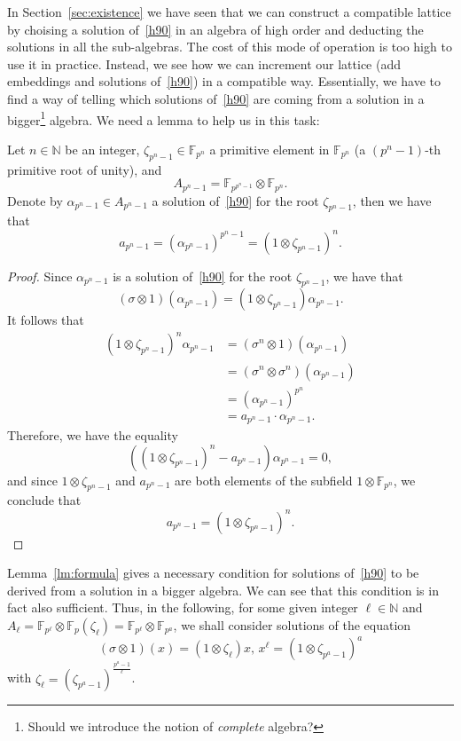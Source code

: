 \documentclass[a4paper,11pt]{article}
\begin{document}
In Section~\ref{sec:existence} we have seen that we can construct a compatible
lattice by choising a solution of~\eqref{h90} in an algebra of high order and
deducting the solutions in all the sub-algebras. The cost of this mode of
operation is too high to use it in practice. Instead, we see how we can
increment our lattice (\ie add embeddings and solutions of~\eqref{h90}) in a compatible way.
Essentially, we have to find a way of telling which solutions of~\eqref{h90} are
coming from a solution in a bigger\footnote{Should we introduce the notion of 
\emph{complete} algebra?} algebra. We need a lemma to help us in this task:
\begin{lm}
  \label{lm:formula}
  Let $n\in\mathbb{N}$ be an integer, $\zeta_{p^n-1}\in\mathbb{F}_{p^n}$ a
  primitive element in $\mathbb{F}_{p^n}$ (\ie a $(p^n-1)$-th primitive root of
  unity), and 
  \[
    A_{p^n-1} = \mathbb{F}_{p^{p^n-1}}\otimes\mathbb{F}_{p^n}.
  \]
  Denote by $\alpha_{p^n-1}\in A_{p^{n}-1}$ a solution of~\eqref{h90} for the
  root $\zeta_{p^n-1}$, then we have that
  \[
    a_{p^n-1} = (\alpha_{p^n-1})^{p^n-1} = (1\otimes\zeta_{p^n-1})^n.
  \]
\end{lm}
\begin{proof}
  Since $\alpha_{p^n-1}$ is a solution of~\eqref{h90} for the root
  $\zeta_{p^n-1}$, we have that
  \[
    (\sigma\otimes 1)(\alpha_{p^n-1}) =
    (1\otimes\zeta_{p^n-1})\alpha_{p^n-1}.
  \]
  It follows that
  \begin{align*}
    (1\otimes\zeta_{p^n-1})^n \alpha_{p^n-1} &= (\sigma^n\otimes1)(\alpha_{p^n-1})\\
    &= (\sigma^n\otimes\sigma^n)(\alpha_{p^n-1})\\
    &= (\alpha_{p^n-1})^{p^n}\\
    &= a_{p^n-1}\cdot\alpha_{p^n-1}.
  \end{align*}
  Therefore, we have the equality
  \[
    ( (1\otimes\zeta_{p^n-1})^n - a_{p^n-1})\alpha_{p^n-1} = 0,
  \]
  and since $1\otimes\zeta_{p^n-1}$ and $a_{p^n-1}$ are both elements of the
  subfield $1\otimes\mathbb{F}_{p^n}$, we conclude that 
  \[
    a_{p^n-1} = (1\otimes\zeta_{p^n-1})^n.
  \]
\end{proof}
Lemma~\ref{lm:formula} gives a necessary condition for solutions of~\eqref{h90}
to be derived from a solution in a bigger algebra. We can see that this condition is in fact
also sufficient. Thus, in the following, for some given integer
$\ell\in\mathbb{N}$ and $A_\ell =
\mathbb{F}_{p^\ell}\otimes\mathbb{F}_{p}(\zeta_\ell) =
\mathbb{F}_{p^\ell}\otimes\mathbb{F}_{p^a}$, we shall consider solutions of the
equation
\begin{equation}
  \tag{H90$^\star$}
  (\sigma\otimes1)(x) = (1\otimes\zeta_\ell)x,\,x^\ell =
  (1\otimes\zeta_{p^a-1})^a
  \label{h90s}
\end{equation}
with $\zeta_\ell=(\zeta_{p^a-1})^{\frac{p^a-1}{\ell}}$.
\end{document}
